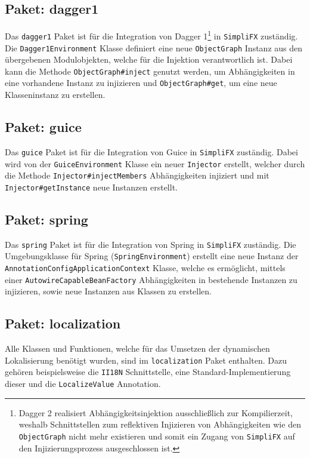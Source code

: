 \subsection{Paket: dagger1}
Das \texttt{dagger1} Paket ist für die Integration von Dagger 1\footnote{Dagger 2 realisiert Abhängigkeitsinjektion ausschließlich zur Kompilierzeit, weshalb Schnittstellen zum reflektiven Injizieren von Abhängigkeiten wie den \texttt{ObjectGraph} nicht mehr existieren und somit ein Zugang von \texttt{SimpliFX} auf den Injizierungsprozess ausgeschlossen ist.} in \texttt{SimpliFX} zuständig. Die \texttt{Dagger1Environment} Klasse definiert eine neue \texttt{ObjectGraph} Instanz aus den übergebenen Modulobjekten, welche für die Injektion verantwortlich ist. Dabei kann die Methode \texttt{ObjectGraph\#inject} genutzt werden, um Abhängigkeiten in eine vorhandene Instanz zu injizieren und \texttt{ObjectGraph\#get}, um eine neue Klasseninstanz zu erstellen. 
\subsection{Paket: guice}
Das \texttt{guice} Paket ist für die Integration von Guice in \texttt{SimpliFX} zuständig. Dabei wird von der \texttt{GuiceEnvironment} Klasse ein neuer \texttt{Injector} erstellt, welcher durch die Methode \texttt{Injector\#injectMembers} Abhängigkeiten injiziert und mit \texttt{Injector\#getInstance} neue Instanzen erstellt.
\subsection{Paket: spring}
Das \texttt{spring} Paket ist für die Integration von Spring in \texttt{SimpliFX} zuständig.
Die Umgebungsklasse für Spring (\texttt{SpringEnvironment}) erstellt eine neue Instanz der \texttt{AnnotationConfigApplicationContext} Klasse, welche es ermöglicht, mittels einer \texttt{AutowireCapableBeanFactory} Abhängigkeiten in bestehende Instanzen zu injizieren, sowie neue Instanzen aus Klassen zu erstellen.
\subsection{Paket: localization}
Alle Klassen und Funktionen, welche für das Umsetzen der dynamischen Lokalisierung benötigt wurden, sind im \texttt{localization} Paket enthalten. Dazu gehören beispielsweise die \texttt{II18N} Schnittstelle, eine Standard-Implementierung dieser und die \texttt{LocalizeValue} Annotation. 
